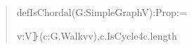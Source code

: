 \documentclass[english,11pt,a4paper]{article}
\newlength{\LeanCharWidth}
\begin{document}
\begin{quote}\fontsize{8.5}{10.2}\selectfont\ttfamily\raggedright\setlength{\parskip}{0pt}\settowidth{\LeanCharWidth}{0}
\noindent def\hspace*{\dimexpr 1\LeanCharWidth\relax}IsChordal\hspace*{\dimexpr 1\LeanCharWidth\relax}(G\hspace*{\dimexpr 1\LeanCharWidth\relax}:\hspace*{\dimexpr 1\LeanCharWidth\relax}SimpleGraph\hspace*{\dimexpr 1\LeanCharWidth\relax}V)\hspace*{\dimexpr 1\LeanCharWidth\relax}:\hspace*{\dimexpr 1\LeanCharWidth\relax}Prop\hspace*{\dimexpr 1\LeanCharWidth\relax}:=\par
\noindent \hspace*{\dimexpr 2\LeanCharWidth\relax}{\LeanSymbols ∀}\hspace*{\dimexpr 1\LeanCharWidth\relax}{\LeanSymbols ⦃}v\hspace*{\dimexpr 1\LeanCharWidth\relax}:\hspace*{\dimexpr 1\LeanCharWidth\relax}V{\LeanSymbols ⦄}\hspace*{\dimexpr 1\LeanCharWidth\relax}(c\hspace*{\dimexpr 1\LeanCharWidth\relax}:\hspace*{\dimexpr 1\LeanCharWidth\relax}G.Walk\hspace*{\dimexpr 1\LeanCharWidth\relax}v\hspace*{\dimexpr 1\LeanCharWidth\relax}v),\hspace*{\dimexpr 1\LeanCharWidth\relax}c.IsCycle\hspace*{\dimexpr 1\LeanCharWidth\relax}{\LeanSymbols →}\hspace*{\dimexpr 1\LeanCharWidth\relax}4\hspace*{\dimexpr 1\LeanCharWidth\relax}{\LeanSymbols ≤}\hspace*{\dimexpr 1\LeanCharWidth\relax}c.length\hspace*{\dimexpr 1\LeanCharWidth\relax}{\LeanSymbols →}\par

\end{quote}
\end{document}
